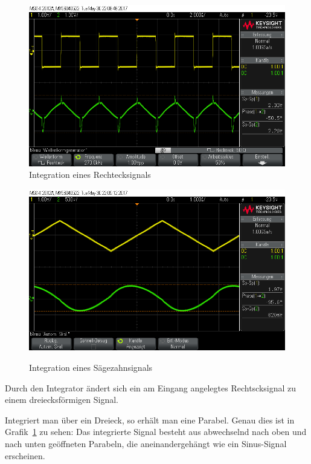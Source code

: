 \documentclass[10pt]{scrreprt}
\begin{document}
    \begin{center}
        \begin{figure}[H]
            \includegraphics[width=\textwidth]{scope_8.png}
            \caption{Integration eines Rechtecksignals}
        \end{figure}
    \end{center}
    \begin{center}
        \begin{figure}[H]
            \includegraphics[width=\textwidth]{scope_9.png}
            \label{fig:Zahn}
            \caption{Integration eines Sägezahnsignals}
        \end{figure}
    \end{center}

    Durch den Integrator ändert sich ein am Eingang angelegtes Rechtscksignal
    zu einem dreiecksförmigen Signal.

    Integriert man über ein Dreieck, so erhält man eine Parabel. Genau dies ist
    in Grafik~\ref{fig:Zahn} zu sehen: Das integrierte Signal besteht aus abwechselnd
    nach oben und nach unten geöffneten Parabeln, die aneinandergehängt wie ein
    Sinus-Signal erscheinen.
\end{document}
